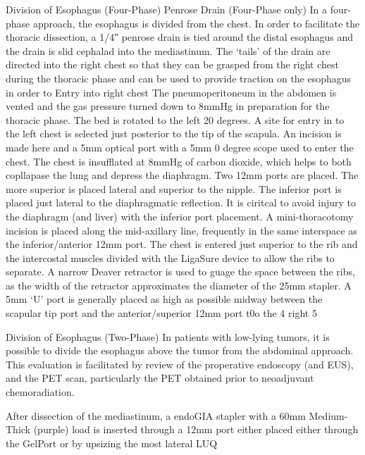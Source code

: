 \documentclass[
]{book}
\begin{document}
Division of Esophagus (Four-Phase)
Penrose Drain (Four-Phase only) In a four-phase approach, the esophagus is divided from the chest. In order to facilitate the thoracic dissection, a 1/4″ penrose drain is tied around the distal esophagus and the drain is slid cephalad into the mediastinum. The `tails' of the drain are directed into the right chest so that they can be grasped from the right chest during the thoracic phase and can be used to provide traction on the esophagus in order to Entry into right chest The pneumoperitoneum in the abdomen is vented and the gas pressure turned down to 8mmHg in preparation for the thoracic phase. The bed is rotated to the left 20 degrees. A site for entry in to the left chest is selected just posterior to the tip of the scapula. An incision is made here and a 5mm optical port with a 5mm 0 degree scope used to enter the chest. The chest is insufflated at 8mmHg of carbon dioxide, which helps to both copllapase the lung and depress the diaphragm. Two 12mm ports are placed. The more superior is placed lateral and superior to the nipple. The inferior port is placed just lateral to the diaphragmatic reflection. It is ciritcal to avoid injury to the diaphragm (and liver) with the inferior port placement. A mini-thoracotomy incision is placed along the mid-axillary line, frequently in the same interspace as the inferior/anterior 12mm port. The chest is entered just superior to the rib and the intercostal muscles divided with the LigaSure device to allow the ribs to separate. A narrow Deaver retractor is used to guage the space between the ribs, as the width of the retractor approximates the diameter of the 25mm stapler. A 5mm `U' port is generally placed as high as possible midway between the scapular tip port and the anterior/superior 12mm port t0o the 4 right 5

Division of Esophagus (Two-Phase)
In patients with low-lying tumors, it is possible to divide the esophagus above the tumor from the abdominal approach. This evaluation is facilitated by review of the properative endoscopy (and EUS), and the PET scan, particularly the PET obtained prior to neoadjuvant chemoradiation.

After dissection of the mediastinum, a endoGIA stapler with a 60mm Medium-Thick (purple) load is inserted through a 12mm port either placed either through the GelPort or by upsizing the most lateral LUQ
\end{document}
